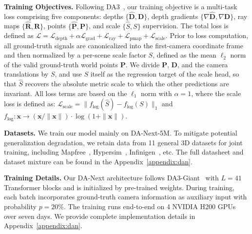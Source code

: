 \documentclass{llmxive}
\providecommand{\dataset}{DA-Next-5M\xspace}
\providecommand{\ours}{DA-Next\xspace}
\begin{document}
\textbf{Training Objectives.}
Following DA3~\citep{lin2025depth}, our training objective is a multi-task loss comprising five components: depths $\{\hat{\mathbf{D}},\mathbf{D}\}$, depth gradients $\{\nabla\hat{\mathbf{D}},\nabla\mathbf{D}\}$, ray maps $\{\hat{\mathbf{R}},\mathbf{R}\}$, points $\{\hat{\mathbf{P}},\mathbf{P}\}$, and scale $\{\hat{S},S\}$ supervision.
%
The total loss is defined as $\mathcal{L} = \mathcal{L}_{\text{depth}} + \alpha \mathcal{L}_{\text{grad}}+ \mathcal{L}_{\text{ray}} + \mathcal{L}_{\text{pmap}} + \mathcal{L}_{\text{scale}}$.
%
Prior to loss computation, all ground-truth signals are canonicalized into the first-camera coordinate frame and then normalized by a per-scene scale factor $S$, defined as the mean $\ell_2$ norm of the valid ground-truth world points $\mathbf{P}$. We divide $\mathbf{P}$, $\mathbf{D}$, and the camera translations by $S$, and use $S$ itself as the regression target of the scale head, so that $\hat{S}$ recovers the absolute metric scale to which the other predictions are invariant.
%
All loss terms are based on the $\ell_1$ norm with $\alpha=1$, where the scale loss is defined as: $\mathcal{L}_{\text{scale}} = \| f_{\log}(\hat{S}) - f_{\log}(S) \|_1$ and $f_{\log }: \mathbf{x} \rightarrow(\mathbf{x} /\|\mathbf{x}\|) \cdot \log (1+\|\mathbf{x}\|)$.


\textbf{Datasets.} 
We train our model mainly on \dataset.
%
To mitigate potential generalization degradation, we retain data from 11 general 3D datasets for joint training, including Mapfree~\citep{arnold2022mapfree}, Hypersim~\citep{roberts2021hypersim}, Infinigen~\citep{raistrick2024infinigen}, etc.
%
The full datasheet and dataset mixture can be found in the Appendix~\ref{appendix:dan}.

\textbf{Training Details.}
Our \ours architecture follows DA3-Giant~\citep{lin2025depth} with $L = 41$ Transformer blocks and is initialized by pre-trained weights.
%
During training, each batch incorporates ground-truth camera information as auxiliary input with probability $p=20\%$.
%
The training runs end-to-end on 4 NVIDIA H200 GPUs over seven days.
%
We provide complete implementation details in Appendix~\ref{appendix:dan}.
\end{document}

